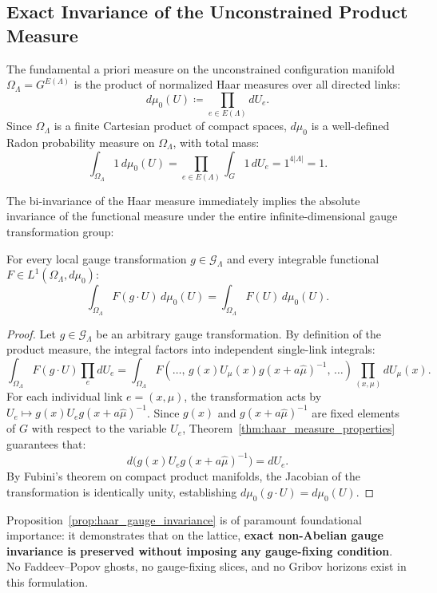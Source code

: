 \subsection{Exact Invariance of the Unconstrained Product Measure}
\label{subsec:product_measure_invariance}
The fundamental a priori measure on the unconstrained configuration manifold $\Omega_\Lambda = G^{E(\Lambda)}$ is the product of normalized Haar measures over all directed links:
\begin{equation}
\label{eq:unconstrained_haar_measure}
d\mu_0(U) \coloneqq \prod_{e \in E(\Lambda)} dU_e.
\end{equation}
Since $\Omega_\Lambda$ is a finite Cartesian product of compact spaces, $d\mu_0$ is a well-defined Radon probability measure on $\Omega_\Lambda$, with total mass:
\begin{equation}
\int_{\Omega_\Lambda} 1 \, d\mu_0(U) = \prod_{e \in E(\Lambda)} \int_G 1 \, dU_e = 1^{4 |\Lambda|} = 1.
\end{equation}

The bi-invariance of the Haar measure immediately implies the absolute invariance of the functional measure under the entire infinite-dimensional gauge transformation group:
\begin{proposition}
\label{prop:haar_gauge_invariance}
For every local gauge transformation $g \in \mathcal{G}_\Lambda$ and every integrable functional $F \in L^1(\Omega_\Lambda, d\mu_0)$:
\begin{equation}
\int_{\Omega_\Lambda} F(g \cdot U) \, d\mu_0(U) = \int_{\Omega_\Lambda} F(U) \, d\mu_0(U).
\end{equation}
\end{proposition}
\begin{proof}
Let $g \in \mathcal{G}_\Lambda$ be an arbitrary gauge transformation. By definition of the product measure, the integral factors into independent single-link integrals:
\begin{equation}
\int_{\Omega_\Lambda} F(g \cdot U) \prod_{e} dU_e = \int_{\Omega_\Lambda} F\left( \dots, \, g(x) U_\mu(x) g(x + a\hat{\mu})^{-1}, \, \dots \right) \prod_{(x, \mu)} dU_\mu(x).
\end{equation}
For each individual link $e = (x, \mu)$, the transformation acts by $U_e \mapsto g(x) U_e g(x + a\hat{\mu})^{-1}$. Since $g(x)$ and $g(x + a\hat{\mu})^{-1}$ are fixed elements of $G$ with respect to the variable $U_e$, Theorem~\ref{thm:haar_measure_properties} guarantees that:
\begin{equation}
d\bigl( g(x) U_e g(x + a\hat{\mu})^{-1} \bigr) = dU_e.
\end{equation}
By Fubini's theorem on compact product manifolds, the Jacobian of the transformation is identically unity, establishing $d\mu_0(g \cdot U) = d\mu_0(U)$.
\end{proof}
Proposition~\ref{prop:haar_gauge_invariance} is of paramount foundational importance: it demonstrates that on the lattice, \textbf{exact non-Abelian gauge invariance is preserved without imposing any gauge-fixing condition}. No Faddeev--Popov ghosts, no gauge-fixing slices, and no Gribov horizons exist in this formulation.

